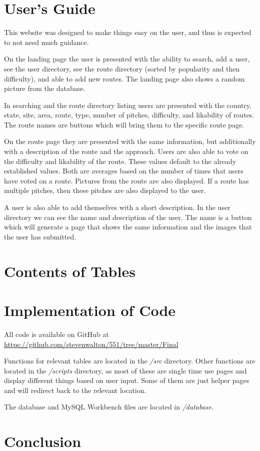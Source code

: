 \documentclass[12pt,letter]{article}
\begin{document}
\section{User's Guide}
This website was designed to make things easy on the user, and thus is expected
to not need much guidance. 

On the landing page the user is presented with the ability to search, add a
user, see the user directory, see the route directory (sorted by popularity and
then difficulty), and able to add new routes. The landing page also shows a
random picture from the database.

In searching and the route directory listing users are presented with the
country, state, site, area, route, type, number of pitches, difficulty, and
likability of routes. The route names are buttons which will bring them to the
specific route page. 

On the route page they are presented with the same information, but additionally
with a description of the route and the approach. Users are also able to vote on
the difficulty and likability of the route. These values default to the already
established values. Both are averages based on the number of times that users
have voted on a route. Pictures from the route are also displayed. If a route
has multiple pitches, then these pitches are also displayed to the user.

A user is also able to add themselves with a short description. In the user
directory we can see the name and description of the user. The name is a button
which will generate a page that shows the same information and the images that
the user has submitted.

\section{Contents of Tables}

\section{Implementation of Code}
All code is available on GitHub at
\href{https://github.com/stevenwalton/551/tree/master/Final}{https://github.com/stevenwalton/551/tree/master/Final}

Functions for relevant tables are located in the \textit{/src} directory. Other
functions are located in the \textit{/scripts} directory, as most of these are
single time use pages and display different things based on user input. Some of
them are just helper pages and will redirect back to the relevant location.

The database and MySQL Workbench files are located in \textit{/database}.

\section{Conclusion}
\end{document}

